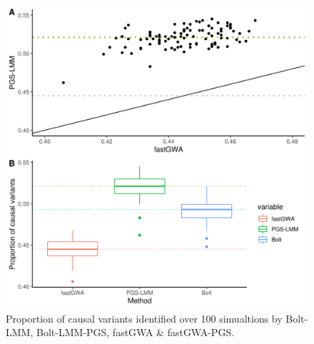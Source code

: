 \documentclass[fleqn,10pt]{wlscirep}
\begin{document}
\begin{figure}
\centering
\includegraphics[width=120mm]{images/Fig1}
\caption{
        Proportion of causal variants identified over 100 simualtions by Bolt-LMM, Bolt-LMM-PGS, fastGWA \& fastGWA-PGS.}
\label{fig:Recovery of causal variants in fixed simulations.}
\end{figure}
\end{document}
